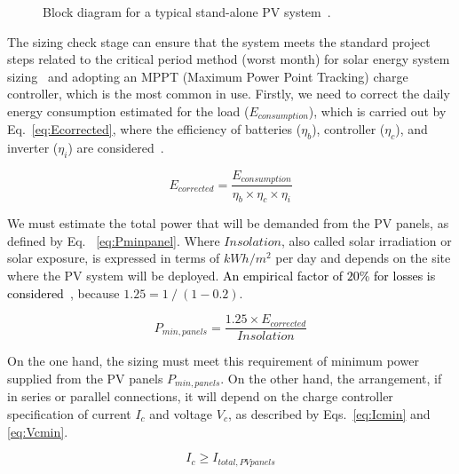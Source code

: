 \documentclass[10pt,journal,compsoc]{IEEEtran}
\begin{document}
\begin{figure}[h]
\centering
\caption{Block diagram for a typical stand-alone PV system~\cite{Hansen}.}
\label{fig:blockdiagram} 
\end{figure}

The sizing check stage can ensure that the system meets the standard project steps related to the critical period method (worst month) for solar energy system sizing~\cite{Pinho} and adopting an MPPT (Maximum Power Point Tracking) charge controller, which is the most common in use. Firstly, we need to correct the daily energy consumption estimated for the load ($E_{consumption}$), which is carried out by Eq.~\eqref{eq:Ecorrected}, where the efficiency of batteries ($\eta_{b}$), controller ($\eta_{c}$), and inverter ($\eta_{i}$) are considered~\cite{Pinho}.

\begin{equation}
\label{eq:Ecorrected}
E_{corrected} = \dfrac{E_{consumption}}{\eta_{b} \times \eta_{c} \times \eta_{i} }
\end{equation}

We must estimate the total power that will be demanded from the PV panels, as defined by Eq. ~\eqref{eq:Pminpanel}. Where $Insolation$, also called solar irradiation or solar exposure, is expressed in terms of $kWh/m^{2}$ per day and depends on the site where the PV system will be deployed. \textcolor{black}{An empirical factor of $20$\% for losses is considered~\cite{Pinho}}, because $1.25 = 1 \mathbin{/} (1 - 0.2)$.

\begin{equation}
\label{eq:Pminpanel}
P_{min,panels} = \dfrac{1.25 \times E_{corrected}}{Insolation}
\end{equation}

On the one hand, the sizing must meet this requirement of minimum power supplied from the PV panels $P_{min,panels}$. On the other hand, the arrangement, if in series or parallel connections, it will depend on the charge controller specification of current $I_{c}$ and voltage $V_{c}$, as described by Eqs.~\eqref{eq:Icmin} and \eqref{eq:Vcmin}.

\begin{equation}
\label{eq:Icmin}
I_{c} \geq I_{total,PVpanels}
\end{equation}
\end{document}
